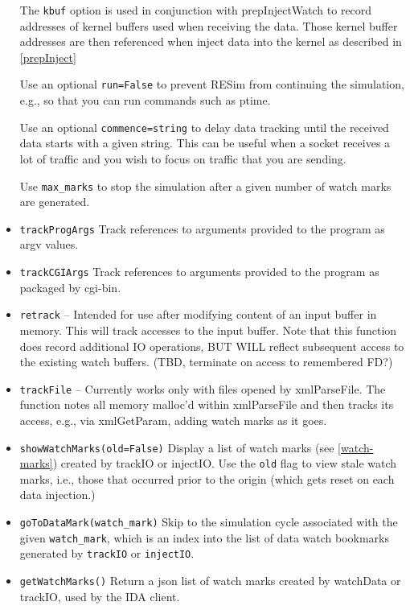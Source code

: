 \documentclass[titlepage]{article}
\begin{document}
\begin{itemize}
The {\tt kbuf} option is used in conjunction with prepInjectWatch to record addresses of kernel buffers used when receiving the data.  Those kernel buffer addresses
are then referenced when inject data into the kernel as described in \ref{prepInject}

Use an optional {\tt run=False} to prevent RESim from continuing the simulation, e.g., so that you can run commands such as ptime.

Use an optional {\tt commence=string} to delay data tracking until the received data starts with a given string.  This can be useful when a socket receives a lot of traffic and you
wish to focus on traffic that you are sending.

Use {\tt max\_marks} to stop the simulation after a given number of watch marks are generated.

\item {\tt trackProgArgs} Track references to arguments provided to the program as argv values.

\item {\tt trackCGIArgs} Track references to arguments provided to the program as packaged by cgi-bin.

\item {\tt retrack} -- Intended for use after modifying content of an input buffer in memory.  This will track accesses to the input buffer.
Note that this function does record additional IO operations, BUT WILL reflect subsequent access to the existing watch buffers.  (TBD, terminate on access
to remembered FD?)

\item {\tt trackFile} -- Currently works only with files opened by xmlParseFile. The function notes all memory malloc'd within
xmlParseFile and then tracks its access, e.g., via xmlGetParam, adding watch marks as it goes.

\item {\tt showWatchMarks(old=False)} Display a list of watch marks (see \ref{watch-marks}) created by trackIO or injectIO.  Use the {\tt old} flag to view stale watch marks, i.e., 
those that occurred prior to the origin (which gets reset on each data injection.)

\item {\tt goToDataMark(watch\_mark)}  Skip to the simulation cycle associated with the given {\tt watch\_mark}, which is an index into the list of data watch bookmarks generated by {\tt trackIO} or {\tt injectIO}.

\item {\tt getWatchMarks()} Return a json list of watch marks created by watchData or trackIO, used by the IDA client.


\end{itemize}
\end{document}
